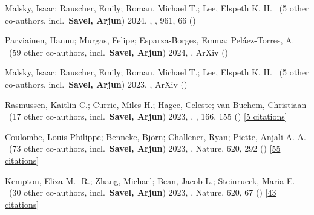 \item[{\color{numcolor}\scriptsize45}] Malsky, Isaac; Rauscher, Emily; Roman, Michael T.; Lee, Elspeth K. H. \etal\ ({5} other co-authors, incl.\ \textbf{Savel, Arjun}) 2024, , \apj, {961}, 66 ()

\item[{\color{numcolor}\scriptsize44}] Parviainen, Hannu; Murgas, Felipe; Esparza-Borges, Emma; Pel{\'a}ez-Torres, A. \etal\ ({59} other co-authors, incl.\ \textbf{Savel, Arjun}) 2024, , ArXiv ()

\item[{\color{numcolor}\scriptsize43}] Malsky, Isaac; Rauscher, Emily; Roman, Michael T.; Lee, Elspeth K. H. \etal\ ({5} other co-authors, incl.\ \textbf{Savel, Arjun}) 2023, , ArXiv ()

\item[{\color{numcolor}\scriptsize42}] Rasmussen, Kaitlin C.; Currie, Miles H.; Hagee, Celeste; van Buchem, Christiaan \etal\ ({17} other co-authors, incl.\ \textbf{Savel, Arjun}) 2023, , \aj, {166}, 155 () [\href{https://ui.adsabs.harvard.edu/abs/2023AJ....166..155R}{5 citations}]

\item[{\color{numcolor}\scriptsize41}] Coulombe, Louis-Philippe; Benneke, Bj{\"o}rn; Challener, Ryan; Piette, Anjali A. A. \etal\ ({73} other co-authors, incl.\ \textbf{Savel, Arjun}) 2023, , Nature, {620}, 292 () [\href{https://ui.adsabs.harvard.edu/abs/2023Natur.620..292C}{55 citations}]

\item[{\color{numcolor}\scriptsize40}] Kempton, Eliza M. -R.; Zhang, Michael; Bean, Jacob L.; Steinrueck, Maria E. \etal\ ({30} other co-authors, incl.\ \textbf{Savel, Arjun}) 2023, , Nature, {620}, 67 () [\href{https://ui.adsabs.harvard.edu/abs/2023Natur.620...67K}{43 citations}]


